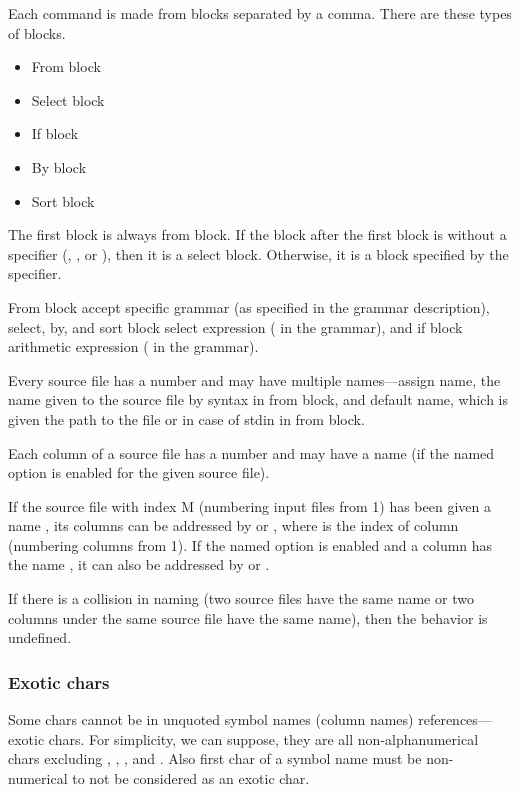 Each command is made from blocks separated by a comma. There are these types of blocks.
\begin{itemize}
    \item From block
    \item Select block
    \item If block
    \item By block
    \item Sort block
\end{itemize}

The first block is always from block. If the block after the first block is without a specifier (, , or ), then it is a select block. Otherwise, it is a block specified by the specifier.

From block accept specific grammar (as specified in the grammar description), select, by, and sort block select expression ( in the grammar), and if block arithmetic expression ( in the grammar).

Every source file has a number and may have multiple names---assign name, the name given to the source file by  syntax in from block, and  
default name, which is given the path to the file or \icode{-} in case of stdin in from block.

Each column of a source file has a number and may have a name (if the named option is enabled for the given source file).

If the source file with index M (numbering input files from 1) has been given a name , its columns can be addressed by  or , where  is the index of column (numbering columns from 1).  
If the named option is enabled and a column has the name , it can also be addressed by  or .

If there is a collision in naming (two source files have the same name or two columns under the same source file have the same name), then the behavior is undefined.

\subsubsection{Exotic chars}
Some chars cannot be in unquoted symbol names (column names) references---exotic chars. For simplicity, we can suppose, they are all non-alphanumerical chars excluding \icode{-}, , \icode{\&}, and \icode{\_}.  
Also first char of a symbol name must be non-numerical to not be considered as an exotic char.

